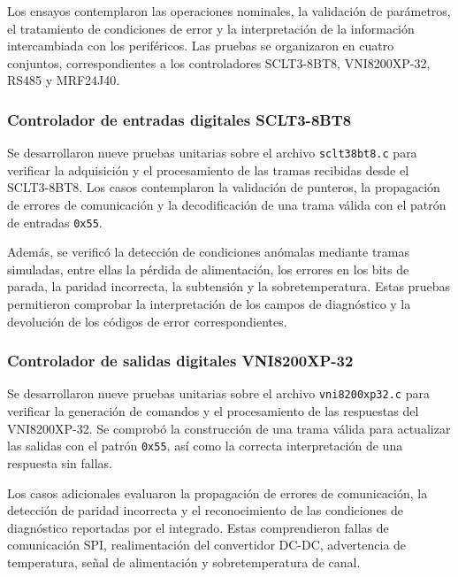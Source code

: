 Los ensayos contemplaron las operaciones nominales, la validación de parámetros, el tratamiento de condiciones de error y la interpretación de la información intercambiada con los periféricos. Las pruebas se organizaron en cuatro conjuntos, correspondientes a los controladores SCLT3-8BT8, VNI8200XP-32, RS485 y MRF24J40.

\subsubsection{Controlador de entradas digitales SCLT3-8BT8}

Se desarrollaron nueve pruebas unitarias sobre el archivo \texttt{sclt38bt8.c} para verificar la adquisición y el procesamiento de las tramas recibidas desde el SCLT3-8BT8. Los casos contemplaron la validación de punteros, la propagación de errores de comunicación y la decodificación de una trama válida con el patrón de entradas \texttt{0x55}.

Además, se verificó la detección de condiciones anómalas mediante tramas simuladas, entre ellas la pérdida de alimentación, los errores en los bits de parada, la paridad incorrecta, la subtensión y la sobretemperatura. Estas pruebas permitieron comprobar la interpretación de los campos de diagnóstico y la devolución de los códigos de error correspondientes.

\subsubsection{Controlador de salidas digitales VNI8200XP-32}

Se desarrollaron nueve pruebas unitarias sobre el archivo \texttt{vni8200xp32.c} para verificar la generación de comandos y el procesamiento de las respuestas del VNI8200XP-32. Se comprobó la construcción de una trama válida para actualizar las salidas con el patrón \texttt{0x55}, así como la correcta interpretación de una respuesta sin fallas.

Los casos adicionales evaluaron la propagación de errores de comunicación, la detección de paridad incorrecta y el reconocimiento de las condiciones de diagnóstico reportadas por el integrado. Estas comprendieron fallas de comunicación SPI, realimentación del convertidor DC-DC, advertencia de temperatura, señal de alimentación y sobretemperatura de canal.

